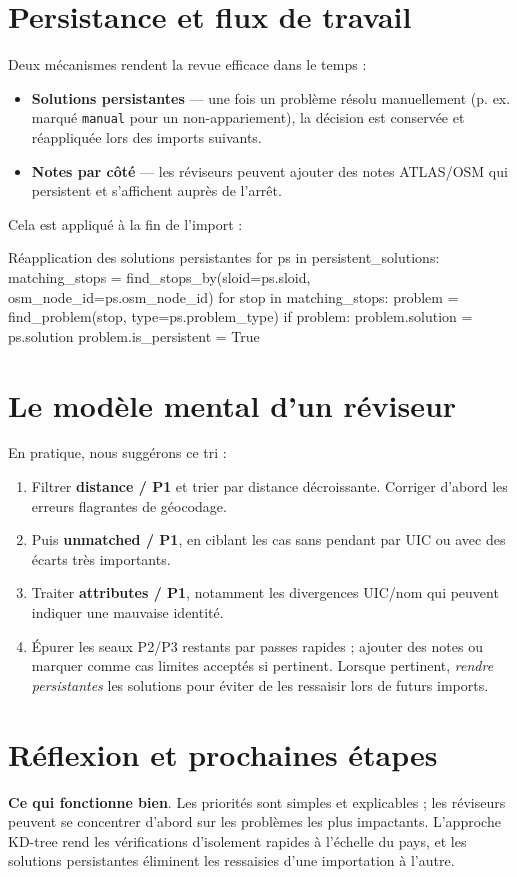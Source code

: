 \section{Persistance et flux de travail}
\label{sec:persist-workflow}
Deux mécanismes rendent la revue efficace dans le temps :
\begin{itemize}
  \item \textbf{Solutions persistantes} — une fois un problème résolu manuellement (p. ex. marqué \texttt{manual} pour un non-appariement), la décision est conservée et réappliquée lors des imports suivants.
  \item \textbf{Notes par côté} — les réviseurs peuvent ajouter des notes ATLAS/OSM qui persistent et s'affichent auprès de l'arrêt.
\end{itemize}

\noindent Cela est appliqué à la fin de l'import :
\begin{codebox}[language=Python]{Réapplication des solutions persistantes}
for ps in persistent_solutions:
    matching_stops = find_stops_by(sloid=ps.sloid, osm_node_id=ps.osm_node_id)
    for stop in matching_stops:
        problem = find_problem(stop, type=ps.problem_type)
        if problem:
            problem.solution = ps.solution
            problem.is_persistent = True
\end{codebox}

\section{Le modèle mental d'un réviseur}
En pratique, nous suggérons ce tri :
\begin{enumerate}
  \item Filtrer \textbf{distance / P1} et trier par distance décroissante. Corriger d'abord les erreurs flagrantes de géocodage.
  \item Puis \textbf{unmatched / P1}, en ciblant les cas sans pendant par UIC ou avec des écarts très importants.
  \item Traiter \textbf{attributes / P1}, notamment les divergences UIC/nom qui peuvent indiquer une mauvaise identité.
  \item Épurer les seaux P2/P3 restants par passes rapides ; ajouter des notes ou marquer comme cas limites acceptés si pertinent. Lorsque pertinent, \emph{rendre persistantes} les solutions pour éviter de les ressaisir lors de futurs imports.
\end{enumerate}

\section{Réflexion et prochaines étapes}
\textbf{Ce qui fonctionne bien}. Les priorités sont simples et explicables ; les réviseurs peuvent se concentrer d'abord sur les problèmes les plus impactants. L'approche KD-tree rend les vérifications d'isolement rapides à l'échelle du pays, et les solutions persistantes éliminent les ressaisies d'une importation à l'autre.

